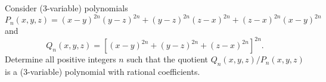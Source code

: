 Consider (3-variable) polynomials \[P_n(x,y,z)=(x-y)^{2n}(y-z)^{2n}+(y-z)^{2n}(z-x)^{2n}+(z-x)^{2n}(x-y)^{2n}\] and \[Q_n(x,y,z)=[(x-y)^{2n}+(y-z)^{2n}+(z-x)^{2n}]^{2n}.\] Determine all positive integers $n$ such that the quotient $Q_n(x,y,z)/P_n(x,y,z)$ is a (3-variable) polynomial with rational coefficients.